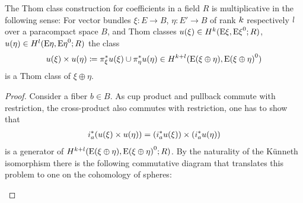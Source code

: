 \begin{Cor}\label{thomclassmultiplicative} %
  The Thom class construction for coefficients in a field $R$ is
  multiplicative in the following sense:
  For vector bundles $\xi\colon E\to B$, $\eta\colon E'\to B$
  of rank $k$ respectively $l$ over a paracompact space $B$, and Thom
  classes
  $u(\xi)\in H^{k}(\mathrm{E}\xi, {\mathrm{E}\xi}^0; R)$,
  $u(\eta)\in H^{l}(\mathrm{E}\eta, {\mathrm{E}\eta}^0; R)$
  the class
  \begin{gather*}
    u(\xi)\times u(\eta)
    \coloneqq {\pi}^*_\xi u(\xi) \cup {\pi}^*_\eta u(\eta)
    \in H^{k+l}(\mathrm{E}(\xi\oplus\eta), {\mathrm{E}(\xi\oplus\eta)}^0)
  \end{gather*}
  is a Thom class of $\xi\oplus\eta$.
  \begin{proof}
    Consider a fiber $b\in B$. As cup product and pullback commute
    with restriction, the cross-product also commutes with
    restriction, \idest one has to show that
    \begin{gather*}
      {i}^*_a(u(\xi)\times u(\eta))
      = \left({i}^*_au(\xi)\right)
      \times \left({i}^*_au(\eta)\right)
    \end{gather*}
    is a generator of
    $H^{k+l}(\mathrm{E}(\xi\oplus\eta), {\mathrm{E}(\xi\oplus\eta)}^0;R)$.
    By the naturality of the Künneth isomorphism there is the
    following commutative diagram that translates this problem to one
    on the cohomology of spheres:
    \begin{center}
\end{center}
\end{proof}
\end{Cor}
